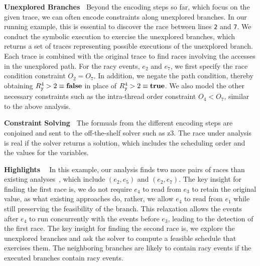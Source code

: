 {\bf Unexplored Branches\ } Beyond the encoding steps so far, which focus on the given trace, we can often encode constraints along unexplored branches. In our running example, this is essential to discover the race between lines {\tt 2} and {\tt 7}. We conduct the symbolic execution to exercise the unexplored branches, which returns a set of traces representing possible executions of the unexplored branch. Each trace is combined with the original trace to find races involving the accesses in the unexplored path. For the racy events, $e_2$ and $e_7$, we first specify the race condition constraint  $O_2=O_7$. In addition, we negate the path condition, thereby obtaining $R_{\tt y}^4 > 2 \equiv {\bf false}$ in place of $R_{\tt y}^4 > 2 \equiv {\bf true}$. We also model the other necessary constraints such as the intra-thread order constraint $O_4 < O_7$, similar to the above analysis.

{\bf Constraint Solving\ } The formuals from the different encoding steps are conjoined and sent to the off-the-shelf solver such as {\sf z3}.  The race under analysis is real if the solver returns a solution, which includes the scheduling order and the values for the variables. 

{\bf Highlights \ } In this example, our analysis finds two more pairs of races than existing analyses~\cite{yannis, jeff}, which include $(e_2, e_5)$ and $(e_2, e_7)$.
The key insight for finding the first race is, we do not require $e_4$ to read from $e_3$ to retain the original value, as what existing approaches do, rather, we allow $e_4$ to read from $e_1$ while still preserving the feasibility of the branch. This relaxation allows the events after $e_4$ to run concurrently with the events before $e_3$, leading to the detection of the first race.  The key insight for finding the second race is, we explore the unexplored branches and ask the solver to compute a feasible schedule that exercises them. The neighboring branches are likely to contain racy events if the executed branches contain racy events.

 
